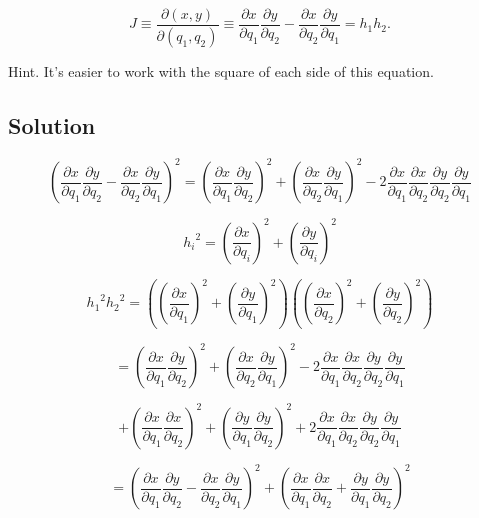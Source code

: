 \documentclass[12pt]{article}
\begin{document}
\[
    J \equiv \frac{\partial(x, y)}{\partial\left(q_{1}, q_{2}\right)} \equiv \frac{\partial x}{\partial q_{1}} \frac{\partial y}{\partial q_{2}}-\frac{\partial x}{\partial q_{2}} \frac{\partial y}{\partial q_{1}}=h_{1} h_{2} .
\]

Hint. It's easier to work with the square of each side of this equation.

\subsection{Solution}

\[
    {\left(\frac{\partial x}{\partial q_{1}} \frac{\partial y}{\partial q_{2}}-\frac{\partial x}{\partial q_{2}} \frac{\partial y}{\partial q_{1}}\right) }^2
    = {\left(\frac{\partial x}{\partial q_{1}} \frac{\partial y}{\partial q_{2}}\right)}^2
    + {\left(\frac{\partial x}{\partial q_{2}} \frac{\partial y}{\partial q_{1}}\right)}^2
    - 2 \frac{\partial x}{\partial q_{1}} \frac{\partial x}{\partial q_{2}} \frac{\partial y}{\partial q_{2}} \frac{\partial y}{\partial q_{1}}
\]

\[
    {h_i}^2 = {\left(\frac{\partial x}{\partial q_i}\right)}^2  + {\left(\frac{\partial y}{\partial q_i}\right)}^2
\]

\[
    {h_1}^2{h_2}^2 = \left({\left(\frac{\partial x}{\partial q_1}\right)}^2  + {\left(\frac{\partial y}{\partial q_1}\right)}^2\right)\left({\left(\frac{\partial x}{\partial q_2}\right)}^2  + {\left(\frac{\partial y}{\partial q_2}\right)}^2\right)
\]

\[
    = {\left(\frac{\partial x}{\partial q_1} \frac{\partial y}{\partial q_2}\right)}^2
    + {\left(\frac{\partial x}{\partial q_2} \frac{\partial y}{\partial q_1}\right)}^2
    - 2 \frac{\partial x}{\partial q_{1}} \frac{\partial x}{\partial q_{2}} \frac{\partial y}{\partial q_{2}} \frac{\partial y}{\partial q_{1}}
\]

\[
    + {\left(\frac{\partial x}{\partial q_1} \frac{\partial x}{\partial q_2}\right)}^2
    + {\left(\frac{\partial y}{\partial q_1} \frac{\partial y}{\partial q_2}\right)}^2
    + 2 \frac{\partial x}{\partial q_{1}} \frac{\partial x}{\partial q_{2}} \frac{\partial y}{\partial q_{2}} \frac{\partial y}{\partial q_{1}}
\]

\[
    = {\left(\frac{\partial x}{\partial q_{1}} \frac{\partial y}{\partial q_{2}}-\frac{\partial x}{\partial q_{2}} \frac{\partial y}{\partial q_{1}}\right) }^2
    + {\left(\frac{\partial x}{\partial q_{1}} \frac{\partial x}{\partial q_{2}}+\frac{\partial y}{\partial q_{1}} \frac{\partial y}{\partial q_{2}}\right) }^2
\]
\end{document}
